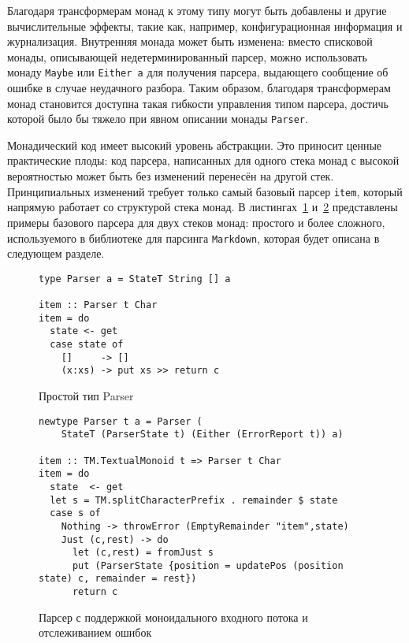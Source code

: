 Благодаря трансформерам монад к этому типу могут быть добавлены и другие вычислительные эффекты, такие как, например, конфигурационная информация и журнализация. Внутренняя монада может быть изменена: вместо списковой монады, описывающей недетерминированный парсер, можно использовать монаду \lstinline{Maybe} или \lstinline{Either a} для получения парсера, выдающего сообщение об ошибке в случае неудачного разбора. Таким образом, благодаря трансформерам монад становится доступна такая гибкости управления типом парсера, достичь которой было бы тяжело при явном описании монады \lstinline{Parser}.

Монадический код имеет высокий уровень абстракции. Это приносит ценные практические плоды: код парсера, написанных для одного стека монад с высокой вероятностью может быть без изменений перенесён на другой стек. Принципиальных изменений требует только самый базовый парсер \lstinline{item}, который напрямую работает со структурой стека монад. В листингах~\ref{listing:MonadTransItem1} и~\ref{listing:MonadTransItem2} представлены примеры базового парсера для двух стеков монад: простого и более сложного, используемого в библиотеке для парсинга \lstinline{Markdown}, которая будет описана в следующем разделе.  

\begin{figure}[t]
\begin{lstlisting}
type Parser a = StateT String [] a

item :: Parser t Char
item = do
  state <- get
  case state of
    []     -> []
    (x:xs) -> put xs >> return c  
\end{lstlisting}
\caption{Простой тип Parser}
\label{listing:MonadTransItem1}
\end{figure}

\begin{figure}[t]
\begin{lstlisting}
newtype Parser t a = Parser (  
    StateT (ParserState t) (Either (ErrorReport t)) a)

item :: TM.TextualMonoid t => Parser t Char
item = do
  state  <- get
  let s = TM.splitCharacterPrefix . remainder $ state
  case s of 
    Nothing -> throwError (EmptyRemainder "item",state)
    Just (c,rest) -> do  
      let (c,rest) = fromJust s
      put (ParserState {position = updatePos (position state) c, remainder = rest})
      return c
\end{lstlisting}
\caption{Парсер с поддержкой моноидального входного потока и отслеживанием ошибок}
\label{listing:MonadTransItem2}
\end{figure}


